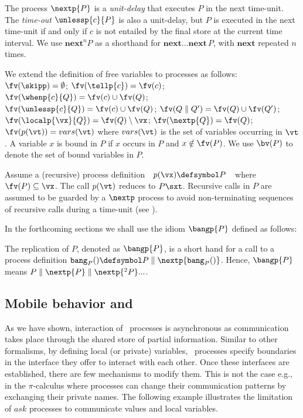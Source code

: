 \documentclass{tlp}
\begin{document}
The process  \( \nextp{P} \) is a \emph{unit-delay} that executes $P$
in the next time-unit.  The \emph{time-out} \( \unlessp{c}{P} \) is
also a unit-delay, but  \( P \)  is executed in the next time-unit if
and only if  \( c \) is not entailed by the final store at the
current time interval. We use \( \mathbf{next}^{n}P \) as a shorthand
for
 \( \mathbf{next} \dots \mathbf{next}\, P \), 
with  \(\mathbf{next}\) repeated $n$ times.  


We extend the definition of free variables to processes as follows:   $\fv(\skipp)=\emptyset$; $\fv(\tellp{c}) = \fv(c)$; $\fv(\whenp{c}{Q}) =  \fv(c) \cup \fv(Q)$; $\fv(\unlessp{c}{Q})= \fv(c) \cup \fv(Q)$; $\fv(Q \parallel Q')=\fv(Q) \cup \fv(Q')$; $\fv(\localp{\vx}{Q})=\fv(Q)\setminus \vx$; $\fv(\nextp{Q})=\fv(Q)$;  $\fv(p(\vt)) = vars(\vt)$ where $vars(\vt)$ is the set of variables occurring in $\vt$. 
A variable $x$ is bound in $P$ if $x$ occurs in $P$ and $x\notin \fv(P)$. We use $\bv(P)$ to denote the set of bound variables in $P$. 


Assume a (recursive) process definition 
$
\ \ p(\vx) \defsymbol P \ \ 
$ where  $ \fv(P) \subseteq \vx $. The call $p(\vt)$ reduces to $P\sxt$.
Recursive calls in $P$ are assumed to be guarded by a 
$\nextp$ process to avoid non-terminating sequences of recursive
calls during a time-unit  (see \cite{tcc-lics94,NPV02}). 







In the forthcoming sections  we shall use the idiom $\bangp{P}$ defined as follows:
\begin{notation}[Replication]\label{rem:bang}
The replication of $P$, denoted as 
$\bangp{P}$,  is a short hand for a call to a process definition  $\texttt{bang}_P() \defsymbol P \parallel \nextp{\texttt{bang}_P()}$. 
Hence, $\bangp{P}$ means    $P \parallel \nextp{P} \parallel \nextp{^2 P} ...$. 
\end{notation}







\subsection{Mobile behavior and \utcc}\label{sec:mobility}
As we have shown, interaction of \tccp\ processes is asynchronous as
communication takes place through the shared store of partial
information. Similar to other formalisms, by defining local (or
private) variables, \tccp\ processes specify boundaries in the
interface they offer to interact with each other. Once these
interfaces are established, there are few mechanisms to modify them.
This is not the case e.g., in the $\pi$-calculus \cite{milner.parrow.ea:calculus-mobile} where
processes can change their communication patterns by exchanging their
private names.  The following example illustrates the limitation of  $ask$ processes to communicate values and local variables.
\end{document}
